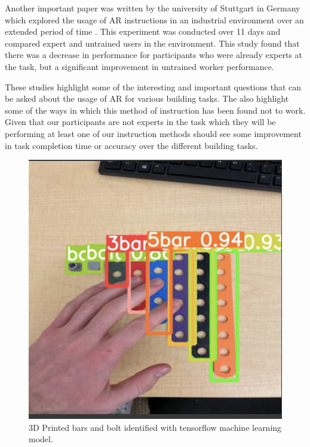 \documentclass{vgtc}                          %
\begin{document}
Another important paper was written by the university of Stuttgart in Germany which explored the usage of AR instructions in an industrial environment over an extended period of time \cite{Funk17}. This experiment was conducted over 11 days and compared expert and untrained users in the environment. This study found that there was a decrease in performance for participants who were already experts at the task, but a significant improvement in untrained worker performance. \cite{Funk17}

These studies highlight some of the interesting and important questions that can be asked about the usage of AR for various building tasks. The also highlight some of the ways in which this method of instruction has been found not to work. Given that our participants are not experts in the task which they will be performing at least one of our instruction methods should see some improvement in task completion time or accuracy over the different building tasks.

\begin{figure}[!htbp]
    \centering
    \includegraphics[width=\columnwidth]{bars-identified.png}
    \caption{3D Printed bars and bolt identified with tensorflow machine learning model.}
    \label{fig:bars_idd}
\end{figure}
\end{document}
